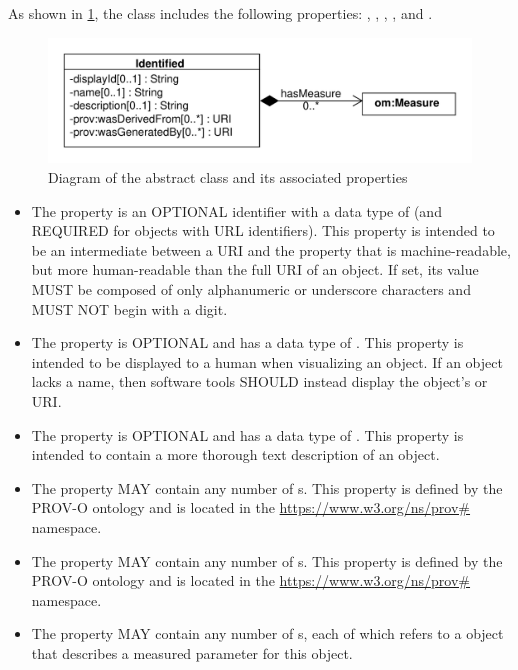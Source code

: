 As shown in \ref{uml:identified}, the  class includes the following properties: ,  , , , and . 

\begin{figure}[ht]
\begin{center}
\includegraphics[scale=0.6]{sbol_uml/identified}
\caption[]{Diagram of the  abstract class and its associated properties}
\label{uml:identified}
\end{center}
\end{figure}

\begin{itemize}
\item \label{sec:sbol:displayId} 
The  property is an OPTIONAL identifier with a data type of  (and REQUIRED for objects with URL identifiers). This property is intended to be an intermediate between a URI and the  property that is machine-readable, but more human-readable than the full URI of an object.
If set, its  value MUST be composed of only alphanumeric or underscore characters and MUST NOT begin with a digit.

\item \label{sec:sbol:name}
The  property is OPTIONAL and has a data type of . This property is intended to be displayed to a human when visualizing an  object.
If an  object lacks a name, then software tools SHOULD instead display the object's  or URI.

\item \label{sec:sbol:description}
The  property is OPTIONAL and has a data type of . This property is intended to contain a more thorough text description of an  object.

\item \label{sec:prov:wasDerivedFrom}
The  property MAY contain any number of s. This property is defined by the PROV-O ontology and is located in the \url{https://www.w3.org/ns/prov#} namespace.

\item \label{sec:prov:wasGeneratedBy}
The  property MAY contain any number of s. This property is defined by the PROV-O ontology and is located in the \url{https://www.w3.org/ns/prov#} namespace.

\item \label{sec:sbol:hasMeasure}
The  property MAY contain any number of s, each of which refers to a  object that describes a measured parameter for this object.
\end{itemize}

